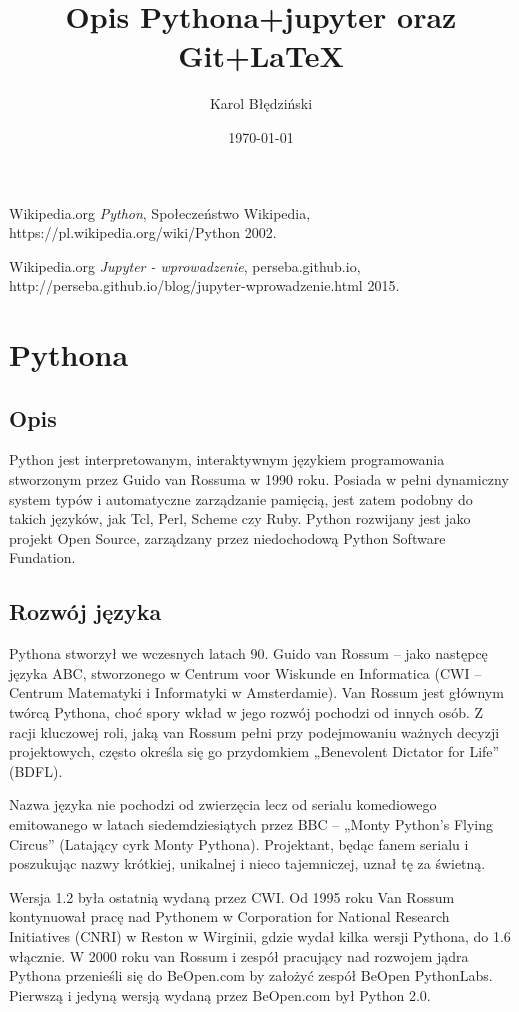 \documentclass{article}
\title{Opis Pythona+jupyter oraz Git+LaTeX}
\date{\today}
\author{Karol Błędziński}
\begin{document}
  \maketitle
  \begin{thebibliography}{9}

  Wikipedia.org
  \textit{ Python},
  Społeczeństwo Wikipedia,
  https://pl.wikipedia.org/wiki/Python
  2002.
  
  Wikipedia.org
  \textit{Jupyter - wprowadzenie},
  perseba.github.io,
  http://perseba.github.io/blog/jupyter-wprowadzenie.html
  2015.

\end{thebibliography}
  \newpage

\section{Pythona}
\subsection{Opis}
	Python jest interpretowanym, interaktywnym językiem programowania stworzonym przez Guido van Rossuma w 1990 roku. Posiada w pełni dynamiczny system typów i automatyczne zarządzanie pamięcią, jest zatem podobny do takich języków, jak Tcl, Perl, Scheme czy Ruby. Python rozwijany jest jako projekt Open Source, zarządzany przez niedochodową Python Software Fundation.
\subsection{Rozwój języka}
	Pythona stworzył we wczesnych latach 90. Guido van Rossum – jako następcę języka ABC, stworzonego w Centrum voor Wiskunde en Informatica (CWI – Centrum Matematyki i Informatyki w Amsterdamie). Van Rossum jest głównym twórcą Pythona, choć spory wkład w jego rozwój pochodzi od innych osób. Z racji kluczowej roli, jaką van Rossum pełni przy podejmowaniu ważnych decyzji projektowych, często określa się go przydomkiem „Benevolent Dictator for Life” (BDFL).

Nazwa języka nie pochodzi od zwierzęcia lecz od serialu komediowego emitowanego w latach siedemdziesiątych przez BBC – „Monty Python’s Flying Circus” (Latający cyrk Monty Pythona). Projektant, będąc fanem serialu i poszukując nazwy krótkiej, unikalnej i nieco tajemniczej, uznał tę za świetną.

Wersja 1.2 była ostatnią wydaną przez CWI. Od 1995 roku Van Rossum kontynuował pracę nad Pythonem w Corporation for National Research Initiatives (CNRI) w Reston w Wirginii, gdzie wydał kilka wersji Pythona, do 1.6 włącznie. W 2000 roku van Rossum i zespół pracujący nad rozwojem jądra Pythona przenieśli się do BeOpen.com by założyć zespół BeOpen PythonLabs. Pierwszą i jedyną wersją wydaną przez BeOpen.com był Python 2.0.
\end{document}
